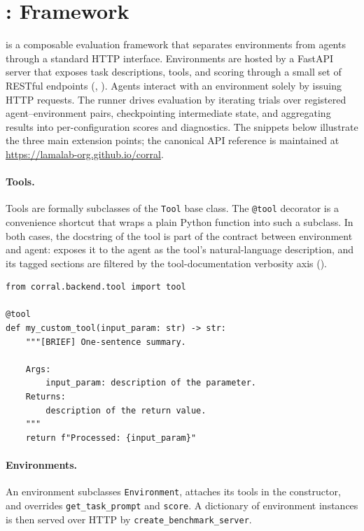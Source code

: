 \section[Corral: Framework]{%
    \texorpdfstring{\corral \corrallogo: Framework}{Corral: Framework}%
} \label{sec:corral-framework}
\label{app:framework-details}
\corral is a composable evaluation framework that separates environments from agents through a standard HTTP interface. Environments are hosted by a FastAPI server that exposes task descriptions, tools, and scoring through a small set of RESTful endpoints (, ). Agents interact with an environment solely by issuing HTTP requests. The \corral runner drives evaluation by iterating trials over registered agent--environment pairs, checkpointing intermediate state, and aggregating results into per-configuration scores and diagnostics. The snippets below illustrate the three main extension points; the canonical API reference is maintained at \url{https://lamalab-org.github.io/corral}.

\paragraph{Tools.} Tools are formally subclasses of the \texttt{Tool} base class. The \texttt{@tool} decorator is a convenience shortcut that wraps a plain Python function into such a subclass. In both cases, the docstring of the tool is part of the contract between environment and agent: \corral exposes it to the agent as the tool's natural-language description, and its tagged sections are filtered by the tool-documentation verbosity axis ().

\begin{lstlisting}[caption={Defining a tool via the decorator shortcut.}]
from corral.backend.tool import tool

@tool
def my_custom_tool(input_param: str) -> str:
    """[BRIEF] One-sentence summary.

    Args:
        input_param: description of the parameter.
    Returns:
        description of the return value.
    """
    return f"Processed: {input_param}"
\end{lstlisting}

\paragraph{Environments.} An environment subclasses \texttt{Environment}, attaches its tools in the constructor, and overrides \texttt{get\_task\_prompt} and \texttt{score}. A dictionary of environment instances is then served over HTTP by \texttt{create\_benchmark\_server}.

